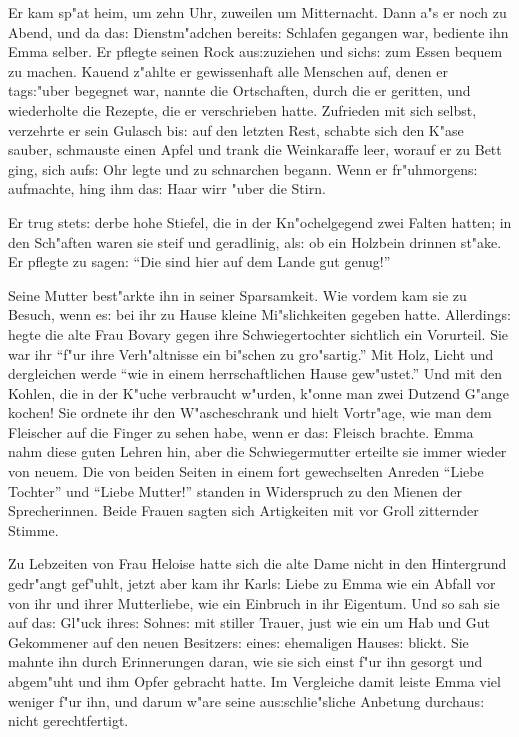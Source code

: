 \documentclass[oneside,12pt]{book}
\newcommand{\s}{s:}%
\begin{document}
Er kam sp"at heim, um zehn Uhr, zuweilen um Mitternacht. Dann a"s
er noch zu Abend, und da da{\s} Dienstm"adchen bereit{\s} Schlafen
gegangen war, bediente ihn Emma selber. Er pflegte seinen Rock
au{\s}zuziehen und sich{\s} zum Essen bequem zu machen. Kauend
z"ahlte er gewissenhaft alle Menschen auf, denen er tag{\s}"uber
begegnet war, nannte die Ortschaften, durch die er geritten, und
wiederholte die Rezepte, die er verschrieben hatte. Zufrieden mit
sich selbst, verzehrte er sein Gulasch bi{\s} auf den letzten
Rest, schabte sich den K"ase sauber, schmauste einen Apfel und
trank die Weinkaraffe leer, worauf er zu Bett ging, sich auf{\s}
Ohr legte und zu schnarchen begann. Wenn er fr"uhmorgen{\s}
aufmachte, hing ihm da{\s} Haar wirr "uber die Stirn.

Er trug stet{\s} derbe hohe Stiefel, die in der Kn"ochelgegend
zwei Falten hatten; in den Sch"aften waren sie steif und
geradlinig, al{\s} ob ein Holzbein drinnen st"ake. Er pflegte zu
sagen: "`Die sind hier auf dem Lande gut genug!"'

Seine Mutter best"arkte ihn in seiner Sparsamkeit. Wie vordem kam
sie zu Besuch, wenn e{\s} bei ihr zu Hause kleine Mi"slichkeiten
gegeben hatte. Allerding{\s} hegte die alte Frau Bovary gegen ihre
Schwiegertochter sichtlich ein Vorurteil. Sie war ihr "`f"ur ihre
Verh"altnisse ein bi"schen zu gro"sartig."' Mit Holz, Licht und
dergleichen werde "`wie in einem herrschaftlichen Hause
gew"ustet."' Und mit den Kohlen, die in der K"uche verbraucht
w"urden, k"onne man zwei Dutzend G"ange kochen! Sie ordnete ihr
den W"ascheschrank und hielt Vortr"age, wie man dem Fleischer auf
die Finger zu sehen habe, wenn er da{\s} Fleisch brachte. Emma
nahm diese guten Lehren hin, aber die Schwiegermutter erteilte sie
immer wieder von neuem. Die von beiden Seiten in einem fort
gewechselten Anreden "`Liebe Tochter"' und "`Liebe Mutter!"'
standen in Widerspruch zu den Mienen der Sprecherinnen. Beide
Frauen sagten sich Artigkeiten mit vor Groll zitternder Stimme.

Zu Lebzeiten von Frau Heloise hatte sich die alte Dame nicht in
den Hintergrund gedr"angt gef"uhlt, jetzt aber kam ihr Karl{\s}
Liebe zu Emma wie ein Abfall vor von ihr und ihrer Mutterliebe,
wie ein Einbruch in ihr Eigentum. Und so sah sie auf da{\s} Gl"uck
ihre{\s} Sohne{\s} mit stiller Trauer, just wie ein um Hab und Gut
Gekommener auf den neuen Besitzer{\s} eine{\s} ehemaligen
Hause{\s} blickt. Sie mahnte ihn durch Erinnerungen daran, wie sie
sich einst f"ur ihn gesorgt und abgem"uht und ihm Opfer gebracht
hatte. Im Vergleiche damit leiste Emma viel weniger f"ur ihn, und
darum w"are seine au{\s}schlie"sliche Anbetung durchau{\s} nicht
gerechtfertigt.
\end{document}
